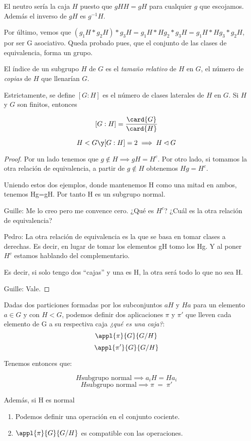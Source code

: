 \documentclass[nochap]{apuntes}
\begin{document}
  El neutro sería la caja $H$ puesto que $gHH=gH$ para cualquier $g$ que escojamos. Además el inverso de $gH$ es $g^{-1}H$.

  Por último, vemos que $(g_{1}H\ast g_{2}H)\ast g_{3}H=g_{1}H\ast Hg_{2}\ast g_{3}H=g_{1}H\ast Hg_{3}\ast g_{2}H$, por ser G asociativo. Queda probado pues, que el conjunto de las clases de equivalencia, forma un grupo.

\begin{defn}\label{defIndiceSG} El índice de un subgrupo $H$ de $G$ es el \textit{tamaño relativo} de $H$ en $G$, el número de \textit{copias} de $H$ que llenarían $G$.

Estrictamente, se define $[G:H]$ es el número de clases laterales de $H$ en $G$. Si $H$ y $G$ son finitos, entonces

\[ [G:H] = \frac{\card{G}}{\card{H}} \]
\end{defn}

  \begin{theorem}
   \[ H< G \y [G:H]=2 \implies H \lhd G \]
  \end{theorem}

  \begin{proof}
   Por un lado tenemos que $g\notin H \implies gH= H^{c}$. Por otro lado, si tomamos la otra relación de equivalencia, a partir de $g \notin H$ obtenemos $Hg=H^{c}$.

   Uniendo estos dos ejemplos, donde mantenemos H como una mitad en ambos, tenemos Hg=gH. Por tanto H es un subgrupo normal.

   Guille: Me lo creo pero me convence cero. ¿Qué es $H^c$? ¿Cuál es la otra relación de equivalencia?

   Pedro: La otra relación de equivalencia es la que se basa en tomar clases a derechas. Es decir, en lugar de tomar los elementos
   gH tomo los Hg. Y al poner $H^{c}$  estamos hablando del complementario.

   Es decir, si solo tengo dos ``cajas'' y una es H, la otra será todo lo que no sea H.

   Guille: Vale.
  \end{proof}

  \begin{lemma}
   Dadas dos particiones formadas por los subconjuntos $aH$ y $Ha$ para un elemento $a \in G$ y con $H <G$, podemos definir dos aplicaciones $\pi$ y $\pi '$ que lleven cada elemento de G a su respectiva caja \textit{¿qué es una caja?}:
   \[ \appl{\pi}{G}{G/H} \]
   \[ \appl{\pi'}{G}{G/H} \]

   Tenemos entonces que:

   \[ H \text{subgrupo normal} \implies a_iH = Ha_i \]
   \[ H \text{subgrupo normal} \implies \pi \ =\ \pi ' \]

   Además, si H es normal
   \begin{enumerate}
	\item Podemos definir una operación en el conjunto cociente.
	\item $\appl{\pi}{G}{G/H}$ es compatible con las operaciones.
   \end{enumerate}

  \end{lemma}
\end{document}
